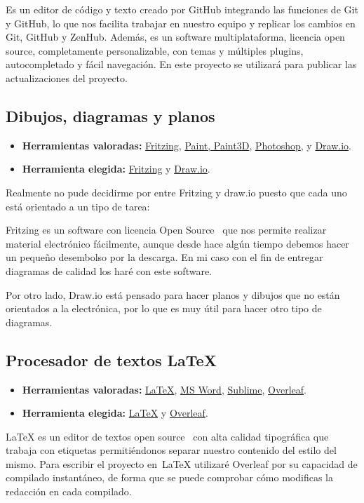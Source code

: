 Es un editor de código y texto creado por GitHub integrando las funciones de Git y GitHub, lo que nos facilita trabajar en nuestro equipo y replicar los cambios en Git, GitHub y ZenHub. Además, es un software multiplataforma, licencia open source, completamente personalizable, con temas y múltiples plugins, autocompletado y fácil navegación.
En este proyecto se utilizará para publicar las actualizaciones del proyecto.



\subsection{Dibujos, diagramas y planos}\label{4:plataformasDibujosYPlanos}
\begin{itemize}
    \item \textbf{Herramientas valoradas:} \href{https://fritzing.org/}{Fritzing}, \href{https://support.microsoft.com/es-es/windows/obtener-microsoft-paint-a6b9578c-ed1c-5b09-0699-4ed8115f9aa9}{Paint, Paint3D}, \href{https://www.adobe.com/es/products/photoshop.html}{Photoshop}, y \href{www.draw.io}{Draw.io}.
    \item \textbf{Herramienta elegida:} \href{https://fritzing.org/}{Fritzing} y \href{www.draw.io}{Draw.io}.
\end{itemize}
Realmente no pude decidirme por entre Fritzing y draw.io puesto que cada uno está orientado a un tipo de tarea:

Fritzing es un software con licencia Open Source~\cite{misc:OpenSource} que nos permite realizar material electrónico fácilmente, aunque desde hace algún tiempo debemos hacer un pequeño desembolso por la descarga. En mi caso con el fin de entregar diagramas de calidad los haré con este software.

Por otro lado, Draw.io está pensado para hacer planos y dibujos que no están orientados a la electrónica, por lo que es muy útil para hacer otro tipo de diagramas.

\subsection{Procesador de textos \LaTeX}\label{4:latex}
\begin{itemize}
    \item \textbf{Herramientas valoradas:} \href{https://www.latex-project.org/}{\LaTeX}, \href{https://www.microsoft.com/es-es/microsoft-365/word}{MS Word}, \href{https://www.sublimetext.com/}{Sublime}, \href{https://www.overleaf.com/}{Overleaf}.
    \item \textbf{Herramienta elegida:} \href{https://www.latex-project.org/}{\LaTeX} y \href{https://www.overleaf.com/}{Overleaf}.
\end{itemize}
\LaTeX{} es un editor de textos open source~\cite{misc:OpenSource} con alta calidad tipográfica que trabaja con etiquetas permitiéndonos separar nuestro contenido del estilo del mismo. Para escribir el proyecto en~\LaTeX{} utilizaré Overleaf por su capacidad de compilado instantáneo, de forma que se puede comprobar cómo modificas la redacción en cada compilado.

